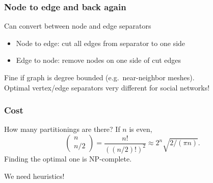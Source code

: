 \documentclass{beamer}
\begin{document}
\begin{frame}
  \frametitle{Node to edge and back again}


  \vspace{3mm}
  Can convert between node and edge separators
  \begin{itemize}
  \item Node to edge: cut all edges from separator to one side
  \item Edge to node: remove nodes on one side of cut edges
  \end{itemize}
  Fine if graph is degree bounded (e.g.~near-neighbor meshes). \\
  Optimal vertex/edge separators very different for social networks!
  
\end{frame}


\begin{frame}
  \frametitle{Cost}

  How many partitionings are there?  If $n$ is even,
  \[
    \begin{pmatrix} n \\ n/2 \end{pmatrix} =
    \frac{n!}{( (n/2)! )^2} \approx 
    2^n \sqrt{2/(\pi n)}.
  \]
  Finding the optimal one is NP-complete.

  \vspace{1cm}
  We need heuristics!
\end{frame}
\end{document}
